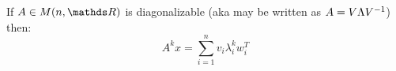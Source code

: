 \documentclass[computationalMathematics.tex]{subfiles}
\begin{document}

\begin{proposition}
  If $A \in M(n, \R)$ is diagonalizable (aka may be written as $A = V \Lambda {V}^{-1}$) 
  then:
  \[
    A^k x = \sum\limits_{i=1}^{n} v_i\lambda^k_i w_i^T
  \]
\end{proposition}
\end{document}
